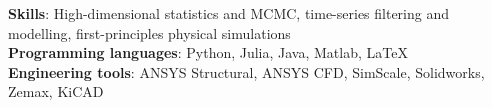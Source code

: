 \documentclass[paper=a4,fontsize=10pt]{scrartcl}
\begin{document}
\noindent
\textbf{Skills}: High-dimensional statistics and MCMC, time-series filtering and modelling, first-principles physical simulations\\
\textbf{Programming languages}: Python, Julia, Java, Matlab, LaTeX\\
\textbf{Engineering tools}: ANSYS Structural, ANSYS CFD, SimScale, Solidworks, Zemax, KiCAD
\end{document}
